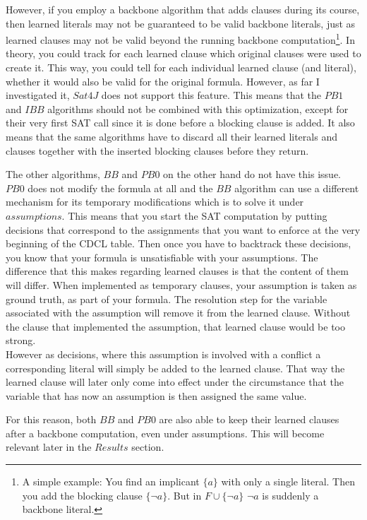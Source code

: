 However, if you employ a backbone algorithm that adds clauses during its course, then learned literals may not be guaranteed to be valid backbone literals, just as learned clauses may not be valid beyond the running backbone computation\footnote{
	A simple example: You find an implicant $\{a\}$ with only a single literal. Then you add the blocking clause $\{\neg a\}$. But in $F \cup \{\neg a\}$ $\neg a$ is suddenly a backbone literal.}.
In theory, you could track for each learned clause which original clauses were used to create it. This way, you could tell for each individual learned clause (and literal), whether it would also be valid for the original formula. However, as far I investigated it, $Sat4J$ does not support this feature. This means that the $PB1$ and $IBB$ algorithms should not be combined with this optimization, except for their very first SAT call since it is done before a blocking clause is added. It also means that the same algorithms have to discard all their learned literals and clauses together with the inserted blocking clauses before they return.

The other algorithms, $BB$ and $PB0$ on the other hand do not have this issue. $PB0$ does not modify the formula at all and the $BB$ algorithm can use a different mechanism for its temporary modifications which is to solve it under $assumptions$. This means that you start the SAT computation by putting decisions that correspond to the assignments that you want to enforce at the very beginning of the CDCL table. Then once you have to backtrack these decisions, you know that your formula is unsatisfiable with your assumptions. The difference that this makes regarding learned clauses is that the content of them will differ. When implemented as temporary clauses, your assumption is taken as ground truth, as part of your formula. The resolution step for the variable associated with the assumption will remove it from the learned clause. Without the clause that implemented the assumption, that learned clause would be too strong.\\
However as decisions, where this assumption is involved with a conflict a corresponding literal will simply be added to the learned clause. That way the learned clause will later only come into effect under the circumstance that the variable that has now an assumption is then assigned the same value.

For this reason, both $BB$ and $PB0$ are also able to keep their learned clauses after a backbone computation, even under assumptions. This will become relevant later in the $Results$ section.


